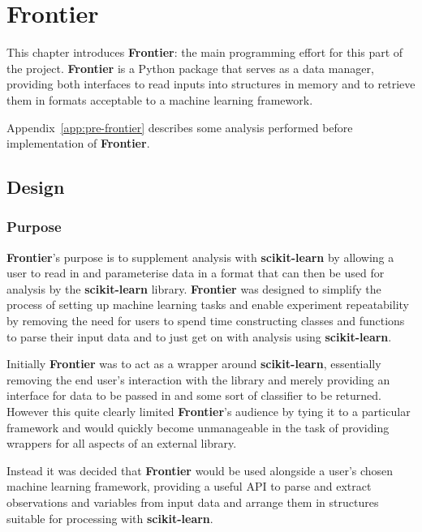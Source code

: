 \chapter{Frontier}
\ifpdf
    \graphicspath{{Chapter3/Figs/Raster/}{Chapter3/Figs/PDF/}{Chapter3/Figs/}}
\else
    \graphicspath{{Chapter3/Figs/Vector/}{Chapter3/Figs/}}
\fi


This chapter introduces \textbf{Frontier}: the main programming effort for this
part of the project. \textbf{Frontier} is a Python package that serves as a data manager,
providing both interfaces to read inputs into structures in memory and to
retrieve them in formats acceptable to a machine learning framework.

Appendix~\ref{app:pre-frontier} describes some analysis performed before
implementation of \textbf{Frontier}.

\section{Design}
\subsection{Purpose}

\textbf{Frontier}'s purpose is to supplement analysis with \textbf{scikit-learn} by
allowing a user to read in and parameterise data in a format that can then be
used for analysis by the \textbf{scikit-learn} library.  \textbf{Frontier} was designed
to simplify the process of setting up machine learning tasks and enable
experiment repeatability by removing the need for users to spend time
constructing classes and functions to parse their input data and to just get on
with analysis using \textbf{scikit-learn}.

Initially \textbf{Frontier} was to act as a wrapper around \textbf{scikit-learn},
essentially removing the end user's interaction with the library and merely
providing an interface for data to be passed in and some sort of classifier to
be returned. However this quite clearly limited \textbf{Frontier}'s audience by tying it
to a particular framework and would quickly become unmanageable in the task of
providing wrappers for all aspects of an external library.

Instead it was decided that \textbf{Frontier} would be used alongside a user's chosen
machine learning framework, providing a useful API to parse and extract
observations and variables from input data and arrange them in structures
suitable for processing with \textbf{scikit-learn}.

